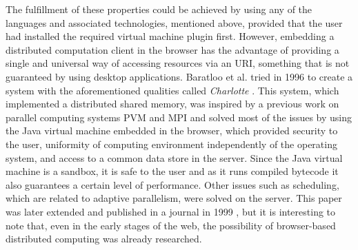 \documentclass[journal,onecolumn]{IEEEtran}
\begin{document}
The fulfillment of these properties could be achieved by using any of the
languages and associated technologies, mentioned above, provided that the user had
installed the required virtual machine plugin first. 
However, embedding a
distributed computation client in the browser has the advantage of
providing a single and universal way of accessing resources via an
URI, something that is not guaranteed by using desktop
applications. Baratloo et al. tried in 1996 to create a system with
the aforementioned qualities called {\em Charlotte}
\cite{baratloo1996charlotte}. This system, which implemented a
distributed shared memory, was inspired by a previous work
on parallel computing systems PVM and MPI and solved most of the issues by
using the Java virtual machine embedded in the browser,
which provided
security to the user, uniformity of computing environment
independently of the operating system, and access to a common data store in the
server. Since the Java virtual machine is a sandbox, it is safe to the user
and as it runs compiled bytecode it also guarantees a certain level of
performance.
Other issues such as scheduling, which are related to adaptive 
parallelism, were solved on the server. This
paper was later extended and published in a journal in 1999
\cite{baratloo1999charlotte}, but it is interesting to note that,
even in the early stages of the web, the possibility of
browser-based distributed computing was already researched. 
\end{document}
